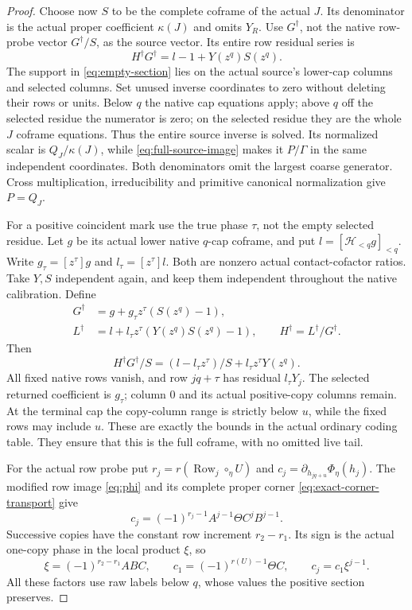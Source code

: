\documentclass[11pt,a4paper]{amsart}
\numberwithin{equation}{section}
\theoremstyle{plain}
\theoremstyle{definition}
\newcommand{\Row}{\operatorname{Row}}
\begin{document}
\begin{proof}
Choose now \(S\) to be the complete coframe of the actual \(J\).
Its denominator is the actual proper coefficient \(\kappa(J)\) and omits
\(Y_R\).
Use \(G^\dagger\), not the native row-probe vector \(G^\dagger/S\),
as the source vector.  Its entire row residual series is
\[
 H^\dagger G^\dagger=l-1+Y(z^q)S(z^q).
\]
The support in \eqref{eq:empty-section} lies on the actual source's
lower-cap columns and selected columns.  Set unused inverse coordinates
to zero without deleting their rows or units.  Below \(q\) the native cap
equations apply; above \(q\) off the selected residue the numerator is
zero; on the selected residue they are the whole \(J\) coframe equations.
Thus the entire source inverse is solved.  Its normalized scalar is
\(Q_J/\kappa(J)\), while \eqref{eq:full-source-image} makes it \(P/\Gamma\)
in the same independent coordinates.  Both denominators omit the largest
coarse generator.  Cross multiplication, irreducibility and primitive
canonical normalization give \(P=Q_J\).

For a positive coincident mark use the true phase \(\tau\), not the empty
selected residue.  Let \(g\) be its actual lower native \(q\)-cap coframe,
and put \(l=[\mathcal H_{<q}g]_{<q}\).  Write \(g_\tau=[z^\tau]g\) and
\(l_\tau=[z^\tau]l\).  Both are nonzero actual contact-cofactor ratios.
Take \(Y,S\) independent again, and keep them independent throughout the
native calibration.  Define
\begin{equation}\label{eq:positive-section}
 \begin{aligned}
 G^\dagger&=g+g_\tau z^\tau(S(z^q)-1),\\
 L^\dagger&=l+l_\tau z^\tau(Y(z^q)S(z^q)-1),\qquad
 H^\dagger=L^\dagger/G^\dagger.
 \end{aligned}
\end{equation}
Then
\[
 H^\dagger G^\dagger/S
   =(l-l_\tau z^\tau)/S+l_\tau z^\tau Y(z^q).
\]
All fixed native rows vanish, and row \(jq+\tau\) has residual
\(l_\tau Y_j\).  The selected returned coefficient is \(g_\tau\); column \(0\)
and its actual positive-copy columns remain.  At the terminal cap the
copy-column range is strictly below \(u\), while the fixed rows may include
\(u\).  These are exactly the bounds in the actual ordinary coding table.
They ensure that this is the full coframe, with no omitted live tail.

For the actual row probe put \(r_j=r(\Row_j\circ_\eta U)\) and
\(c_j=\partial_{h_{jq+u}}\Phi_\eta(h_j)\).  The modified row image
\eqref{eq:phi} and its complete proper corner
\eqref{eq:exact-corner-transport} give
\[
 c_j=(-1)^{r_j-1}A^{j-1}\Theta C^jB^{j-1}.
\]
Successive copies have the constant row increment \(r_2-r_1\).
Its sign is the actual one-copy phase in the local product \(\xi\), so
\[
 \xi=(-1)^{r_2-r_1}ABC,\qquad
 c_1=(-1)^{r(U)-1}\Theta C,\qquad c_j=c_1\xi^{j-1}.
\]
All these factors use raw labels below \(q\), whose values the positive
section preserves.


\end{proof}
\end{document}
